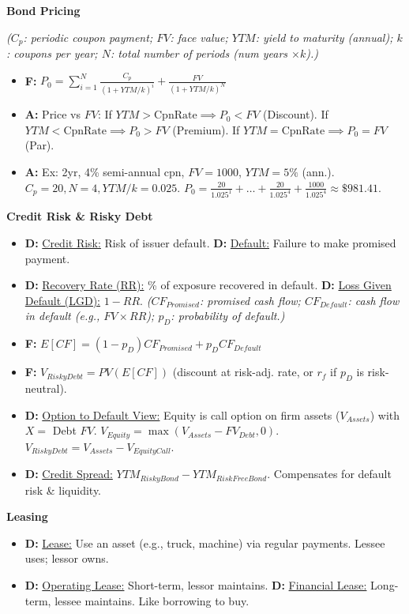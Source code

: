 \documentclass[7pt,landscape]{extarticle} %
\newcommand{\cheatsheetsubsubsection}[1]{%
  \vspace{0.15ex plus 0.05ex minus 0.05ex}%
  \noindent\textbf{\sffamily\scriptsize #1}%
  \par\vspace{0.05ex}%
}
\newcommand{\D}[1]{\textbf{\textcolor{DefColor}{D:}} \uline{#1}}
\newcommand{\F}[1]{\textbf{\textcolor{FormColor}{F:}} #1}
\newcommand{\A}[1]{\textbf{\textcolor{AppColor}{A:}} #1}
\newcommand{\SF}[1]{\textit{\small (#1)}} %
\begin{document}
\begin{multicols*}{4}
  \cheatsheetsubsubsection{Bond Pricing}
  \SF{$C_p$: periodic coupon payment; $FV$: face value; $YTM$: yield to maturity (annual); $k$: coupons per year; $N$: total number of periods (num years $\times k$).}
  \begin{itemize}
    \item \F{$P_0 = \sum_{i=1}^{N} \frac{C_p}{(1+YTM/k)^i} + \frac{FV}{(1+YTM/k)^N}$}
    \item \A{Price vs $FV$: If $YTM > \text{CpnRate} \implies P_0 < FV$ (Discount). If $YTM < \text{CpnRate} \implies P_0 > FV$ (Premium). If $YTM = \text{CpnRate} \implies P_0 = FV$ (Par).}
    \item \A{Ex: 2yr, 4\% semi-annual cpn, $FV=1000$, $YTM=5\%$ (ann.). $C_p=20, N=4, YTM/k=0.025$. $P_0 = \frac{20}{1.025^1} + \dots + \frac{20}{1.025^4} + \frac{1000}{1.025^4} \approx \$981.41$.}
  \end{itemize}
  
  \cheatsheetsubsubsection{Credit Risk \& Risky Debt}
  \begin{itemize}
    \item \D{Credit Risk:} Risk of issuer default. \D{Default:} Failure to make promised payment.
    \item \D{Recovery Rate (RR):} \% of exposure recovered in default. \D{Loss Given Default (LGD):} $1-RR$.
          \SF{$CF_{Promised}$: promised cash flow; $CF_{Default}$: cash flow in default (e.g., $FV \times RR$); $p_D$: probability of default.}
    \item \F{$E[CF] = (1-p_D)CF_{Promised} + p_D CF_{Default}$}
    \item \F{$V_{RiskyDebt} = PV(E[CF])$} (discount at risk-adj. rate, or $r_f$ if $p_D$ is risk-neutral).
    \item \D{Option to Default View:} Equity is call option on firm assets ($V_{Assets}$) with $X=$ Debt $FV$. $V_{Equity} = \max(V_{Assets} - FV_{Debt}, 0)$. $V_{RiskyDebt} = V_{Assets} - V_{EquityCall}$.
    \item \D{Credit Spread:} $YTM_{RiskyBond} - YTM_{RiskFreeBond}$. Compensates for default risk \& liquidity.
  \end{itemize}
  
  \cheatsheetsubsubsection{Leasing}
\begin{itemize}
  \item \D{Lease:} Use an asset (e.g., truck, machine) via regular payments. Lessee uses; lessor owns.
  
  \item \D{Operating Lease:} Short-term, lessor maintains.  
        \D{Financial Lease:} Long-term, lessee maintains. Like borrowing to buy.
      

\end{itemize}
\end{multicols*}
\end{document}
